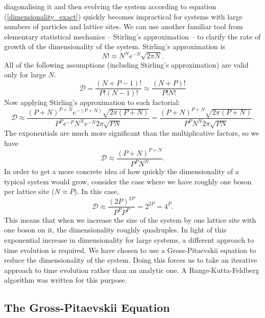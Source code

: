 \documentclass[a4paper, 10pt]{article}
\theoremstyle{plain}
\begin{document}
diagonalising it and then evolving the system according to equation
(\ref{dimensionality_exact}) quickly becomes impractical for systems with large
numbers of particles and lattice sites. We can use another familiar tool from
elementary statistical mechanics -- Stirling's approximation -- to clarify the
rate of growth of the dimensionality of the system. Stirling's
approximation \cite{Schroeder2007} is
\begin{equation}
    N! \approx N^{N} e^{-N} \sqrt{2 \pi N}.
\end{equation}
All of the following assumptions (including Stirling's approximation) are
valid only for large $N$.
\begin{equation*}
    \mathcal{D} = \frac{(N + P - 1)!}{P! (N-1)!}
    \approx
    \frac{(N + P)!}{P! N!}
\end{equation*}
Now applying Stirling's approximation to each factorial:
\begin{equation*}
    \mathcal{D}
    \approx
    \frac{(P + N)^{P+N} e^{-(P + N)} \sqrt{2 \pi (P+N)}}
         {P^{P} e^{-P} N^{N} e^{-N} 2 \pi \sqrt{PN}}
    =
    \frac{(P + N)^{P+N} \sqrt{2 \pi (P+N)}}
         {P^{P} N^{N} 2\pi \sqrt{PN}}.
\end{equation*}
The exponentials are much more significant than the multiplicative factors,
so we have
\begin{equation*}
    \mathcal{D} \approx \frac{(P + N)^{P+N}}{P^P N^N}.
\end{equation*}
In order to get a more concrete idea of how quickly the dimensionality of a
typical system would grow, consider the case where we have roughly one boson
per lattice site ($N \approx P$). In this case,
\begin{equation*}
    \mathcal{D} \approx \frac{(2P)^{2P}}{P^{P} P^{P}} = 2^{2P} = 4^{P}.
\end{equation*}
This means that when we increase the size of the system by one lattice site
with one boson on it, the dimensionality roughly quadruples. In light of
this exponential increase in dimensionality for large systems, a different
approach to time evolution is required. We have chosen to use a
Gross-Pitaevskii equation to reduce the dimensionality of the system. Doing
this forces us to take an iterative approach to time evolution rather than an
analytic one. A Runge-Kutta-Feldberg algorithm \cite{Burden2005} was written
for this purpose.


\subsection{The Gross-Pitaevskii Equation}
\end{document}
